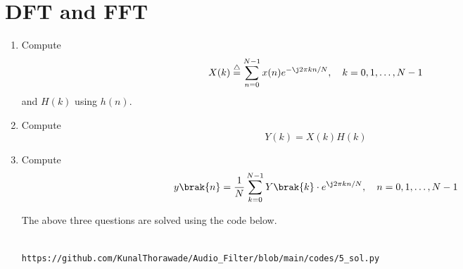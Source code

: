 \documentclass[journal,12pt,twocolumn]{IEEEtran}
\newcommand{\define}{\stackrel{\triangle}{=}}
\theoremstyle{remark}
\begin{document}
																																																											  \section{DFT and FFT}
																																																											  \begin{enumerate}[label=\thesection.\arabic*]
																																																											  \item
																																																											  Compute
																																																											  \begin{equation}
																																																											  X(k) \define \sum _{n=0}^{N-1}x(n) e^{-\j2\pi kn/N}, \quad k = 0,1,\dots, N-1
																																																											  \end{equation}
																																																											  and $H(k)$ using $h(n)$.
																																																											  \item Compute 
																																																											  \begin{equation}
																																																											  Y(k) = X(k)H(k)
																																																											  \label{eq:fp}
																																																											  \end{equation}
																																																											  \item Compute
																																																											  \begin{equation}
																																																											  y\brak{n}={\frac {1}{N}}\sum _{k=0}^{N-1}Y\brak{k}\cdot e^{\j 2\pi kn/N},\quad n = 0,1,\dots, N-1
																																																											  \label{eq:inv-ft}
																																																											  \end{equation}

																																																											  \solution The above three questions are solved using the code below.
																																																											  \begin{lstlisting}
																																																											  https://github.com/KunalThorawade/Audio_Filter/blob/main/codes/5_sol.py
																																																											  \end{lstlisting}


\end{enumerate}
\end{document}
